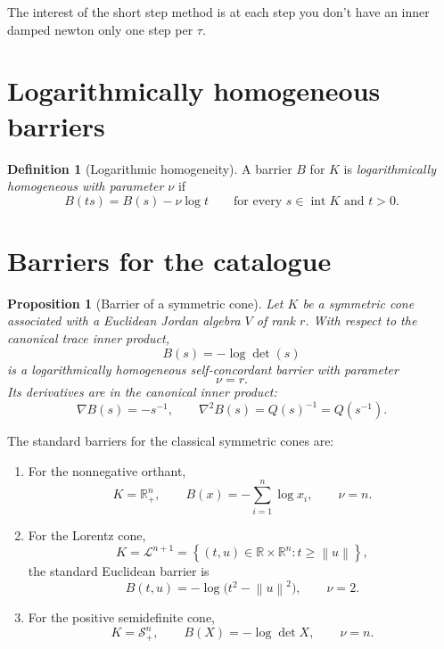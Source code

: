 \documentclass[a4paper,11pt]{book}
\theoremstyle{plain}
\newtheorem{proposition}[theorem]{Proposition}
\theoremstyle{definition}
\newtheorem{definition}[theorem]{Definition}
\theoremstyle{remark}
\numberwithin{equation}{chapter}
\numberwithin{algorithm}{chapter}
\newcommand{\R}{\mathbb{R}}
\newcommand{\Sp}{\mathcal{S}}
\newcommand{\norm}[1]{\left\|#1\right\|}
\newcommand{\intr}{\operatorname{int}}
\newcommand{\Lor}{\mathcal{L}}
\begin{document}
	
	The interest of the short step method is at each step you don't have an inner damped newton only one step per $\tau$.
	\section{Logarithmically homogeneous barriers}
	
	\begin{definition}[Logarithmic homogeneity]
		A barrier \(B\) for \(K\) is \emph{logarithmically homogeneous with
			parameter \(\nu\)} if
		\begin{equation}
			B(ts)
			=
			B(s)-\nu\log t
			\qquad
			\text{for every }s\in\intr K\text{ and }t>0.
			\label{eq:logarithmic-homogeneity}
		\end{equation}
	\end{definition}
	
	
	
	\section{Barriers for the catalogue}
	
	\begin{proposition}[Barrier of a symmetric cone]
		Let \(K\) be a symmetric cone associated with a Euclidean Jordan algebra
		\(V\) of rank \(r\). With respect to the canonical trace inner product,
		\[
		B(s)=-\log\det(s)
		\]
		is a logarithmically homogeneous self-concordant barrier with parameter
		\[
		\nu=r.
		\]
		Its derivatives are in the canonical inner product:
		\begin{equation}
			\nabla B(s)=-s^{-1},
			\qquad
			\nabla^2B(s)=Q(s)^{-1}=Q(s^{-1}).
		\end{equation}
	\end{proposition}
	
	The standard barriers for the classical symmetric cones are:
	
	\begin{enumerate}
		\item For the nonnegative orthant,
		\[
		K=\R_+^n,
		\qquad
		B(x)=-\sum_{i=1}^n\log x_i,
		\qquad
		\nu=n.
		\]
		
		\item For the Lorentz cone,
		\[
		K=\Lor^{n+1}
		=
		\left\{
		(t,u)\in\R\times\R^n:
		t\geq\norm{u}
		\right\},
		\]
		the standard Euclidean barrier is
		\[
		B(t,u)
		=
		-\log\bigl(t^2-\norm{u}^2\bigr),
		\qquad
		\nu=2.
		\]
		
		\item For the positive semidefinite cone,
		\[
		K=\Sp_+^n,
		\qquad
		B(X)=-\log\det X,
		\qquad
		\nu=n.
		\]
	\end{enumerate}
	
\end{document}
